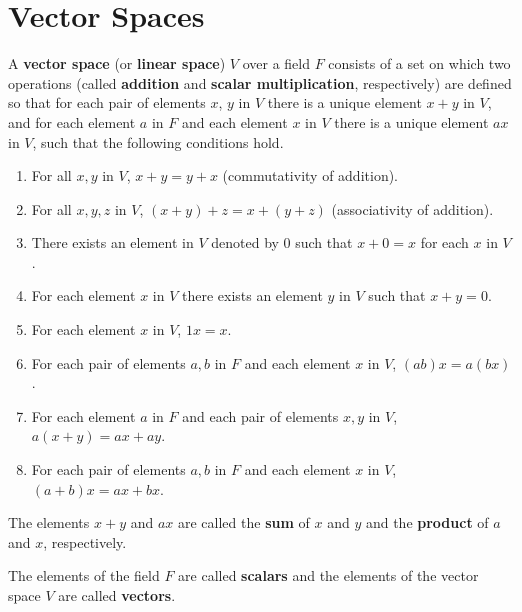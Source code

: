 \section{Vector Spaces}\label{sec:1.2}

\begin{definition}\label{def:1.2.1}
    A \textbf{vector space} (or \textbf{linear space}) \(V\) over a field \(F\) consists of a set on which two operations (called \textbf{addition} and \textbf{scalar multiplication}, respectively) are defined so that for each pair of elements \(x\), \(y\) in \(V\) there is a unique element \(x + y\) in \(V\), and for each element \(a\) in \(F\) and each element \(x\) in \(V\) there is a unique element \(ax\) in \(V\), such that the following conditions hold.
    \begin{enumerate}[label=(VS \arabic*), ref=VS \arabic*]
        \item \label{1.2.1.1}
              For all \(x, y\) in \(V\), \(x + y = y + x\)
              (commutativity of addition).
        \item \label{1.2.1.2}
              For all \(x, y, z\) in \(V\), \((x + y) + z = x + (y + z)\)
              (associativity of addition).
        \item \label{1.2.1.3}
              There exists an element in \(V\) denoted by \(0\) such that \(x + 0 = x\) for each \(x\) in \(V\).
        \item \label{1.2.1.4}
              For each element \(x\) in \(V\) there exists an element \(y\) in \(V\) such that \(x + y = 0\).
        \item \label{1.2.1.5}
              For each element \(x\) in \(V\), \(1x = x\).
        \item \label{1.2.1.6}
              For each pair of elements \(a, b\) in \(F\) and each element \(x\) in \(V\), \((ab)x = a(bx)\).
        \item \label{1.2.1.7}
              For each element \(a\) in \(F\) and each pair of elements \(x, y\) in \(V\), \(a(x + y) = ax + ay\).
        \item \label{1.2.1.8}
              For each pair of elements \(a, b\) in \(F\) and each element \(x\) in \(V\), \((a + b)x = ax + bx\).
    \end{enumerate}
    The elements \(x + y\) and \(ax\) are called the \textbf{sum} of \(x\) and \(y\) and the \textbf{product} of \(a\) and \(x\), respectively.
\end{definition}

\begin{definition}\label{def:1.2.2}
    The elements of the field \(F\) are called \textbf{scalars} and the elements of the vector space \(V\) are called \textbf{vectors}.
\end{definition}

